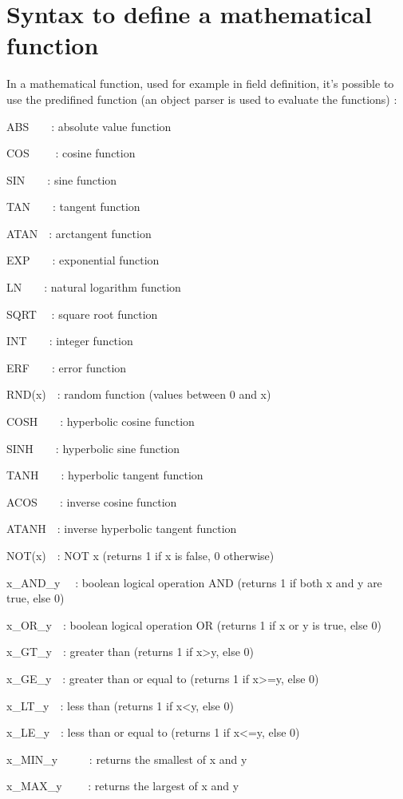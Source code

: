 \section{Syntax to define a mathematical function\label{parser}}
In a mathematical function,
used for example in field definition, it's possible to use the predifined function (an object parser is used to
evaluate the functions) :

ABS\ \ \ \ : absolute value function

COS \ \ \ \ : cosine function

SIN\ \ \ \ : sine function

TAN\ \ \ \ : tangent function

ATAN\ \ : arctangent function

EXP\ \ \ \ : exponential function

LN\ \ \ \ : natural logarithm function

SQRT \ \ : square root function

INT\ \ \ \ : integer function

ERF\ \ \ \ : error function

RND(x)\ \ : random function (values between 0 and x)

COSH\ \ \ \ : hyperbolic cosine function

SINH\ \ \ \ : hyperbolic sine function

TANH\ \ \ \ : hyperbolic tangent function

ACOS\ \ \ \ : inverse cosine function

ATANH\ \ : inverse hyperbolic tangent function

NOT(x)\ \ : NOT x (returns 1 if x is false, 0 otherwise) 

x\_AND\_y \ \ : boolean logical operation AND (returns 1 if both x and y are true, else 0)

x\_OR\_y\ \ : boolean logical operation OR (returns 1 if x or y is true, else 0)

x\_GT\_y\ \ : greater than (returns 1 if x{\textgreater}y, else 0)

x\_GE\_y\ \ : greater than or equal to (returns 1 if x{\textgreater}=y, else 0)

x\_LT\_y\ \ : less than (returns 1 if x{\textless}y, else 0)

x\_LE\_y\ \ : less than or equal to (returns 1 if x{\textless}=y, else 0)

x\_MIN\_y \ \ \ \ \ : returns the smallest of x and y

x\_MAX\_y \ \ \ \ : returns the largest of x and y


